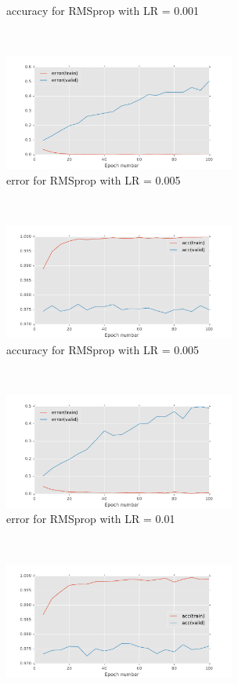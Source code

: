 \documentclass[11pt]{article}
\begin{document}
\begin{figure}[t!]
\begin{subfigure}[t]{0.45\textwidth}
        \caption{accuracy for RMSprop with LR = 0.001}
    \end{subfigure}    
	~
    \begin{subfigure}[t]{0.45\textwidth}
        \centering
        \includegraphics[height=1.5in]{error_with_RMSprop_0_005.pdf}
        \caption{error for RMSprop with LR = 0.005}
    \end{subfigure}   
    ~
    \begin{subfigure}[t]{0.45\textwidth}
        \centering
        \includegraphics[height=1.5in]{acc_with_RMSprop_0_005.pdf}
        \caption{accuracy for RMSprop with LR = 0.005}
    \end{subfigure}    
	~
    \begin{subfigure}[t]{0.45\textwidth}
        \centering
        \includegraphics[height=1.5in]{error_with_RMSprop_0_01.pdf}
        \caption{error for RMSprop with LR = 0.01}
    \end{subfigure}   
    ~
    \begin{subfigure}[t]{0.45\textwidth}
        \centering
        \includegraphics[height=1.5in]{acc_with_RMSprop_0_01.pdf}

\end{subfigure}
\end{figure}
\end{document}
